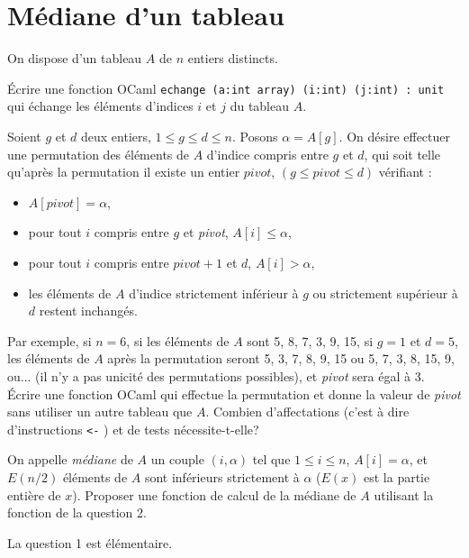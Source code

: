 \renewcommand{\SourceFile}{1-parcours-de-tableaux/src/1-2.ml}

\vspace{16pt}
\section{Médiane d'un tableau}

On dispose d'un tableau $A$ de $n$ entiers distincts.

\Q
Écrire une fonction OCaml \texttt{echange (a:int array) (i:int) (j:int) : unit} qui échange les éléments d'indices $i$ et $j$ du tableau $A$.

\Q
Soient $g$ et $d$ deux entiers, $1\leq g\leq d \leq n$. Posons $\alpha=A[g]$. On désire effectuer une permutation des éléments de $A$ d'indice compris entre $g$ et $d$, qui soit telle qu'après la permutation il existe un entier $pivot$, $(g\leq pivot \leq d)$ vérifiant :

\begin{itemize}
    \item $A[\textit{pivot}]=\alpha$,
    \item pour tout $i$ compris entre $g$ et \textit{pivot}, $A[i]\leq\alpha$,
    \item pour tout $i$ compris entre $\textit{pivot}+1$ et $d$, $A[i]>\alpha$,
    \item les éléments de $A$ d'indice strictement inférieur à $g$ ou strictement supérieur à $d$ restent inchangés.
\end{itemize}

Par exemple, si $n=6$, si les éléments de $A$ sont 5, 8, 7, 3, 9, 15, si $g=1$ et $d=5$, les éléments de $A$ après la permutation seront 5, 3, 7, 8, 9, 15 ou 5, 7, 3, 8, 15, 9, ou... (il n'y a pas unicité des permutations possibles), et \textit{pivot} sera égal à 3. Écrire une fonction OCaml qui effectue la permutation et donne la valeur de \textit{pivot} sans utiliser un autre tableau que $A$. Combien d'affectations (c'est à dire d'instructions \og \texttt{<-} \fg) et de tests nécessite-t-elle?

\Q
On appelle \textit{médiane} de $A$ un couple $(i,\alpha)$ tel que $1\leq i\leq n$, $A[i]=\alpha$, et $E(n/2)$ éléments de $A$ sont inférieurs strictement à $\alpha$ ($E(x)$ est la partie entière de $x$). Proposer une fonction de calcul de la médiane de $A$ utilisant la fonction de la question 2.

\Corrige

\Q
La question 1 est élémentaire.

